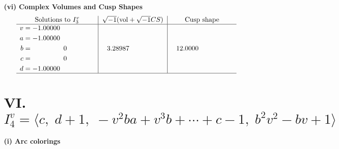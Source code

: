 \documentclass[1p]{elsarticle_modified}
\theoremstyle{definition}
\newcommand{\I}{\sqrt{-1}}
\begin{document}
\newpage\flushleft \textbf{(vi) Complex Volumes and Cusp Shapes}
$$\begin{array}{c|c|c}  
\text{Solutions to }I^v_{3}& \I (\text{vol} + \sqrt{-1}CS) & \text{Cusp shape}\\
 \hline 
\begin{aligned}
v &= -1.00000\phantom{ +0.000000I} \\
a &= -1.00000\phantom{ +0.000000I} \\
b &= \phantom{-0.000000 } 0 \\
c &= \phantom{-0.000000 } 0 \\
d &= -1.00000\phantom{ +0.000000I}\end{aligned}
 & \phantom{-}3.28987\phantom{ +0.000000I} & \phantom{-}12.0000\phantom{ +0.000000I}\\
 \hline 
 \end{array}$$\newpage\newpage\renewcommand{\arraystretch}{1}
\centering \section*{VI. $I^v_{4}= \langle c,\;d+1,\;- v^2 b a+v^3 b+\cdots+c-1,\;b^2 v^2- b v+1 \rangle$}
\flushleft \textbf{(i) Arc colorings}\\
\end{document}
